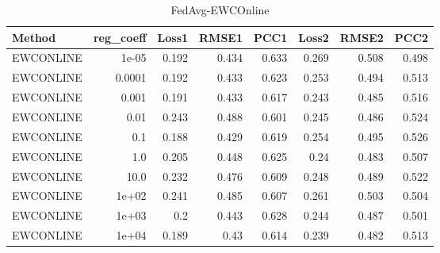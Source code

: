 \begin{table}
\caption{FedAvg-EWCOnline}
\begin{tabular}{lrrrrrrr}
\toprule
Method & reg_coeff & Loss1 & RMSE1 & PCC1 & Loss2 & RMSE2 & PCC2 \\
\midrule
EWCONLINE & 1e-05 & 0.192 & 0.434 & 0.633 & 0.269 & 0.508 & 0.498 \\
EWCONLINE & 0.0001 & 0.192 & 0.433 & 0.623 & 0.253 & 0.494 & 0.513 \\
EWCONLINE & 0.001 & 0.191 & 0.433 & 0.617 & 0.243 & 0.485 & 0.516 \\
EWCONLINE & 0.01 & 0.243 & 0.488 & 0.601 & 0.245 & 0.486 & 0.524 \\
EWCONLINE & 0.1 & 0.188 & 0.429 & 0.619 & 0.254 & 0.495 & 0.526 \\
EWCONLINE & 1.0 & 0.205 & 0.448 & 0.625 & 0.24 & 0.483 & 0.507 \\
EWCONLINE & 10.0 & 0.232 & 0.476 & 0.609 & 0.248 & 0.489 & 0.522 \\
EWCONLINE & 1e+02 & 0.241 & 0.485 & 0.607 & 0.261 & 0.503 & 0.504 \\
EWCONLINE & 1e+03 & 0.2 & 0.443 & 0.628 & 0.244 & 0.487 & 0.501 \\
EWCONLINE & 1e+04 & 0.189 & 0.43 & 0.614 & 0.239 & 0.482 & 0.513 \\
\bottomrule
\end{tabular}
\end{table}

